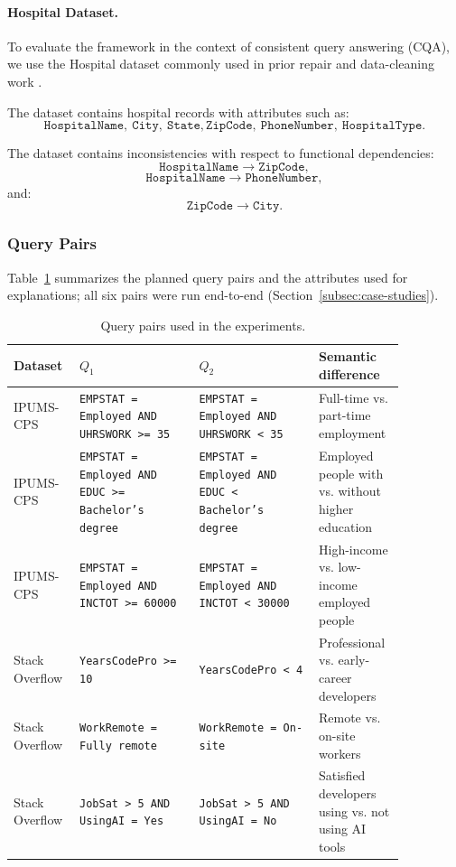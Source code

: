 \paragraph{Hospital Dataset.}
To evaluate the framework in the context of consistent query answering (CQA),
we use the Hospital dataset commonly used in prior repair and data-cleaning
work \cite{rekatsinas2017}.

The dataset contains hospital records with attributes such as:
\[
\texttt{HospitalName},\ \texttt{City},\ \texttt{State},
\texttt{ZipCode},\ \texttt{PhoneNumber},\ \texttt{HospitalType}.
\]

The dataset contains inconsistencies with respect to functional dependencies:
\[
\texttt{HospitalName} \rightarrow \texttt{ZipCode},
\]
\[
\texttt{HospitalName} \rightarrow \texttt{PhoneNumber},
\]
and:
\[
\texttt{ZipCode} \rightarrow \texttt{City}.
\]

\subsubsection{Query Pairs}
Table~\ref{tab:query-pairs} summarizes the planned query pairs and the
attributes used for explanations; all six pairs were run end-to-end
(Section~\ref{subsec:case-studies}).

\begin{table}[t]
\centering
\caption{Query pairs used in the experiments.}
\label{tab:query-pairs}
\begin{tabular}{p{0.12\linewidth} p{0.28\linewidth} p{0.28\linewidth} p{0.18\linewidth}}
\toprule
\textbf{Dataset} & \textbf{$Q_1$} & \textbf{$Q_2$} & \textbf{Semantic difference} \\
\midrule
IPUMS-CPS &
\texttt{EMPSTAT = Employed AND UHRSWORK >= 35} &
\texttt{EMPSTAT = Employed AND UHRSWORK < 35} &
Full-time vs. part-time employment \\

IPUMS-CPS &
\texttt{EMPSTAT = Employed AND EDUC >= Bachelor's degree} &
\texttt{EMPSTAT = Employed AND EDUC < Bachelor's degree} &
Employed people with vs. without higher education \\

IPUMS-CPS &
\texttt{EMPSTAT = Employed AND INCTOT >= 60000} &
\texttt{EMPSTAT = Employed AND INCTOT < 30000} &
High-income vs. low-income employed people \\

Stack Overflow &
\texttt{YearsCodePro >= 10} &
\texttt{YearsCodePro < 4} &
Professional vs. early-career developers \\

Stack Overflow &
\texttt{WorkRemote = Fully remote} &
\texttt{WorkRemote = On-site} &
Remote vs. on-site workers \\

Stack Overflow &
\texttt{JobSat > 5 AND UsingAI = Yes} &
\texttt{JobSat > 5 AND UsingAI = No} &
Satisfied developers using vs. not using AI tools \\
\bottomrule
\end{tabular}
\end{table}

